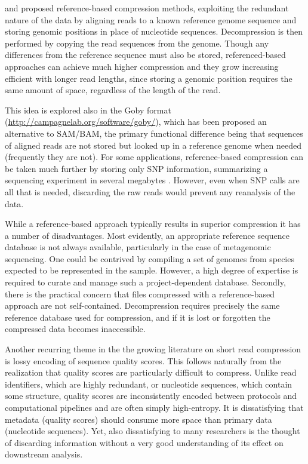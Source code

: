 \documentclass[a4,center,fleqn]{NAR}
\begin{document}
\citet{Kozanitis2011} and \citet{Hsi-YangFritz2011} proposed reference-based
compression methods, exploiting the redundant nature of the data by aligning
reads to a known reference genome sequence and storing genomic positions in
place of nucleotide sequences. Decompression is then performed by copying the
read sequences from the genome. Though any differences from the reference
sequence must also be stored, referenced-based approaches can achieve much
higher compression and they grow increasing efficient with longer read
lengths, since storing a genomic position requires the same amount of space,
regardless of the length of the read.

This idea is explored also in the Goby format
(\url{http://campagnelab.org/software/goby/}), which has been
proposed an alternative to SAM/BAM, the primary functional difference being
that sequences of aligned reads are not stored but looked up in a reference
genome when needed (frequently they are not). For some applications,
reference-based compression can be taken much further by storing only SNP
information, summarizing a sequencing experiment in several megabytes
\citep{Christley2009}. However, even when SNP calls are all that is needed,
discarding the raw reads would prevent any reanalysis of the data.

While a reference-based approach typically results in superior compression it
has a number of disadvantages. Most evidently, an appropriate reference
sequence database is not always available, particularly in the case of
metagenomic sequencing. One could be contrived by compiling a set of genomes
from species expected to be represented in the sample. However, a high degree
of expertise is required to curate and manage such a project-dependent
database. Secondly, there is the practical concern that files compressed with
a reference-based approach are not self-contained. Decompression requires
precisely the same reference database used for compression, and if it is lost
or forgotten the compressed data becomes inaccessible.



Another recurring theme in the the growing literature on short read
compression is lossy encoding of sequence quality scores. This follows
naturally from the realization that quality scores are particularly difficult
to compress. Unlike read identifiers, which are highly redundant, or
nucleotide sequences, which contain some structure, quality scores are
inconsistently encoded between protocols and computational pipelines and are
often simply high-entropy. It is dissatisfying that metadata (quality scores)
should consume more space than primary data (nucleotide sequences). Yet, also
dissatisfying to many researchers is the thought of discarding information
without a very good understanding of its effect on downstream analysis.
\end{document}
